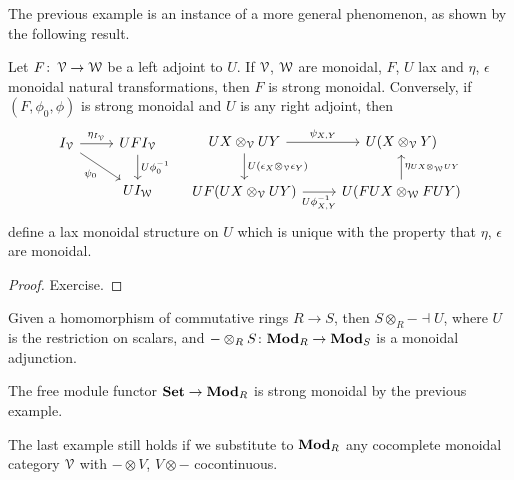 \documentclass[a4paper,11pt,oneside,openany]{scrbook}
\begin{document}
The previous example is an instance of a more general phenomenon, as shown by the following result.

\begin{thm}
    Let $F\colon\operatorname{\mathcal{V}}\rightarrow\operatorname{\mathcal{W}}$ be a left adjoint to $U$. If $\operatorname{\mathcal{V}}$, $\operatorname{\mathcal{W}}$ are monoidal, $F$, $U$ lax and $\eta$, $\epsilon$ monoidal natural transformations, then $F$ is strong monoidal. Conversely, if $(F,\phi_0,\phi)$ is strong monoidal and $U$ is any right adjoint, then
    \[
    \begin{tikzcd}
        I_{\V}\ar[r, "\eta_{I_{\V}}"]\ar[dr, "\psi_0", swap]
        & UFI_{\V}\ar[d, "U\phi_0^{-1}"] \\
        & UI_{\W}
    \end{tikzcd}
    \quad
    \begin{tikzcd}
        UX\otimes_{\V}UY\ar[r, "\psi_{X,Y}"]\ar[d, "U(\epsilon_X\otimes_{\V}\epsilon_Y)"]
        & U(X\otimes_{\V}Y) \\
        UF(UX\otimes_{\V}UY)\ar[r, "U\phi^{-1}_{X,Y}", swap]
        & U(FUX\otimes_{\W}FUY)\ar[u, "\eta_{UX\otimes_{\W}UY}", swap]
    \end{tikzcd}
    \]
    define a lax monoidal structure on $U$ which is unique with the property that $\eta$, $\epsilon$ are monoidal.
\end{thm}

\begin{proof}
    Exercise.
\end{proof}

\begin{exmp}
    Given a homomorphism of commutative rings $R\rightarrow S$, then $S\otimes_R-\dashv U$, where $U$ is the restriction on scalars, and $-\otimes_RS\colon{\normalfont\textbf{Mod}}_R\rightarrow{\normalfont\textbf{Mod}}_S$ is a monoidal adjunction.

    The free module functor ${\normalfont\textbf{Set}}\rightarrow{\normalfont\textbf{Mod}}_R$ is strong monoidal by the previous example.
\end{exmp}

\begin{rmk}
    The last example still holds if we substitute to ${\normalfont\textbf{Mod}}_R$ any cocomplete monoidal category $\operatorname{\mathcal{V}}$ with $-\otimes V$, $V\otimes -$ cocontinuous.
\end{rmk}
\end{document}
